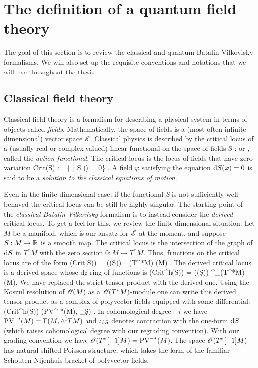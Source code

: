 \section{The definition of a quantum field theory}

The goal of this section is to review the classical and quantum Batalin-Vilkovisky formalisms.
We will also set up the requisite conventions and notations that we will use throughout the thesis. 

\subsection{Classical field theory}

Classical field theory is a formalism for describing a physical system in terms of objects called {\em fields}. 
Mathematically, the space of fields is a (most often infinite dimensional) vector space $\mathscr E$. 
Classical physics is described by the critical locus of a (usually real or complex valued) linear functional on the space of fields 
\be\label{actionfnl}
S : \sE \to \RR \;\; {\rm or} \;\; \CC,
\ee
called the {\em action functional}. 
The critical locus is the locus of fields that have zero variation
\be
{\rm Crit}(S) := \{\varphi \in \sE \; | \; \d S (\varphi) = 0\} .
\ee
A field $\varphi$ satisfying the equation ${\rm d} S (\varphi) = 0$ is said to be a {\em solution to the classical equations of motion}. 

Even in the finite dimensional case, if the functional $S$ is not sufficiently well-behaved the critical locus can be still be highly singular. 
The starting point of the {\em classical Batalin-Vilkovisky} formalism is to instead consider the {\em derived} critical locus.
To get a feel for this, we review the finite dimensional situation.
Let $M$ be a manifold, which is our ansatz for $\mathscr E$ at the moment, and suppose $S : M \to \mathbb R$ is a smooth map.
The critical locus is the intersection of the graph of ${\rm d} S$ in $T^*M$ with the zero section $0 : M \to T^*M$.
Thus, functions on the critical locus are of the form
\ben
\sO({\rm Crit}(S)) = \sO(\Gamma(\d S)) \tensor_{\sO(T^*M)} \sO(M) .
\een
The derived critical locus is a derived space whose dg ring of functions is 
\ben
\sO({\rm Crit}^{h}(S)) = \sO(\Gamma(\d S)) \tensor^{\LL}_{\sO(T^*M)} \sO(M).
\een
We have replaced the strict tensor product with the derived one.
Using the Koszul resolution of $\mathscr O(M)$ as a $\mathscr O(T^*M)$-module one can write this derived tensor product as a complex of polyvector fields equipped with some differential:
\ben
\sO({\rm Crit}^h(S)) \simeq \left({\rm PV}^{-*}(M), \iota_{\d S}\right) .
\een
In cohomological degree $-i$ we have ${\rm PV}^{-i} (M) = \Gamma(M, \wedge^i TM)$ and $\iota_{{\rm d} S}$ denotes contraction with the one-form ${\rm d} S$ (which raises cohomological degree with our regrading convention).
With our grading convention we have $\mathscr O(T^*[-1] M) = {\rm PV}^{-*}(M)$. 
The space $\mathscr O(T^*[-1]M)$ has natural shifted Poisson structure, which takes the form of the familiar Schouten-Nijenhuis bracket of polyvector fields.


